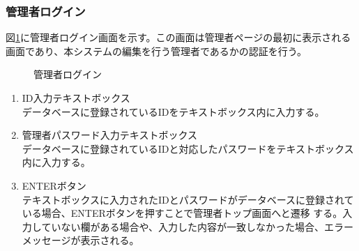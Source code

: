 \documentclass[a4j]{jarticle}
\begin{document}
\subsubsection{管理者ログイン}
図\ref{fig:login_admin}に管理者ログイン画面を示す。この画面は管理者ページの最初に表示される画面であり、本システムの編集を行う管理者であるかの認証を行う。
\begin{figure}[H]
\centering
{}
\caption{管理者ログイン}
\label{fig:login_admin}
\end{figure}
\begin{enumerate}
  \renewcommand{\labelenumi}{\textcircled{\scriptsize \theenumi}}

\item ID入力テキストボックス\\
データベースに登録されているIDをテキストボックス内に入力する。
\item 管理者パスワード入力テキストボックス\\
データベースに登録されているIDと対応したパスワードをテキストボックス内に入力する。
\item ENTERボタン\\
テキストボックスに入力されたIDとパスワードがデータベースに登録されている場合、ENTERボタンを押すことで管理者トップ画面へと遷移
する。入力していない欄がある場合や、入力した内容が一致しなかった場合、エラーメッセージが表示される。

\end{enumerate}
\end{document}
